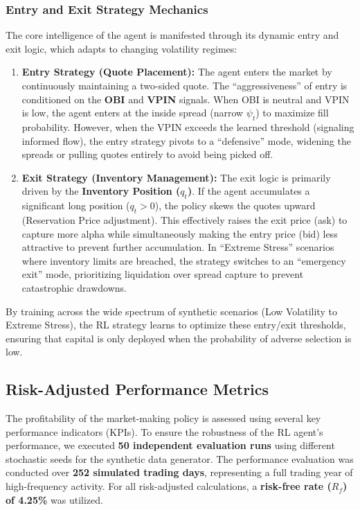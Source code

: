 \subsubsection{Entry and Exit Strategy Mechanics}
The core intelligence of the agent is manifested through its dynamic entry and exit logic, which adapts to changing volatility regimes:

\begin{enumerate}
    \item \textbf{Entry Strategy (Quote Placement):} The agent enters the market by continuously maintaining a two-sided quote. The ``aggressiveness'' of entry is conditioned on the \textbf{OBI} and \textbf{VPIN} signals. When OBI is neutral and VPIN is low, the agent enters at the inside spread (narrow $\psi_t$) to maximize fill probability. However, when the VPIN exceeds the learned threshold (signaling informed flow), the entry strategy pivots to a ``defensive'' mode, widening the spreads or pulling quotes entirely to avoid being picked off.
    \item \textbf{Exit Strategy (Inventory Management):} The exit logic is primarily driven by the \textbf{Inventory Position ($q_t$)}. If the agent accumulates a significant long position ($q_t > 0$), the policy skews the quotes upward (Reservation Price adjustment). This effectively raises the exit price (ask) to capture more alpha while simultaneously making the entry price (bid) less attractive to prevent further accumulation. In ``Extreme Stress'' scenarios where inventory limits are breached, the strategy switches to an ``emergency exit'' mode, prioritizing liquidation over spread capture to prevent catastrophic drawdowns.
\end{enumerate}

By training across the wide spectrum of synthetic scenarios (Low Volatility to Extreme Stress), the RL strategy learns to optimize these entry/exit thresholds, ensuring that capital is only deployed when the probability of adverse selection is low.

\subsection{Risk-Adjusted Performance Metrics}
The profitability of the market-making policy is assessed using several key performance indicators (KPIs). To ensure the robustness of the RL agent's performance, we executed \textbf{50 independent evaluation runs} using different stochastic seeds for the synthetic data generator. The performance evaluation was conducted over \textbf{252 simulated trading days}, representing a full trading year of high-frequency activity. For all risk-adjusted calculations, a \textbf{risk-free rate ($R_f$) of 4.25\%} was utilized.

